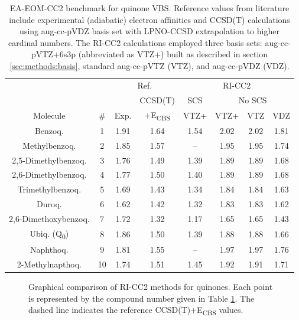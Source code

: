 \begin{table}[h!]
  \centering
  \caption[EA-EOM-CC2 benchmark for quinone VBS.]{EA-EOM-CC2 benchmark for quinone VBS. Reference values from literature\cite{schulz2018systematic} include experimental (adiabatic) electron affinities and CCSD(T) calculations using aug-cc-pVDZ basis set with LPNO-CCSD extrapolation to higher cardinal numbers. The RI-CC2 calculations employed three basis sets: aug-cc-pVTZ+6s3p (abbreviated as VTZ+) built as described in section \ref{sec:methods:basis}, standard aug-cc-pVTZ (VTZ), and aug-cc-pVDZ (VDZ).}
  \label{tab:Quinones}
  \begin{tabular*}{\textwidth}{cccccccc}
  \toprule
   & & \multicolumn{2}{c}{Ref. \cite{schulz2018systematic}} & \multicolumn{4}{c}{RI-CC2}  \\
   \cmidrule(lr){3-4} \cmidrule(lr){5-8}
   & & & CCSD(T) & SCS & \multicolumn{3}{c}{No SCS} \\
  \cmidrule(lr){6-8}
  Molecule & \# & Exp. & +E\textsubscript{CBS} & VTZ+ & VTZ+ & VTZ & VDZ  \\
  \midrule
  Benzoq. & 1  & 1.91 & 1.64 & 1.54 & 2.02 & 2.02 & 1.81 \\
  Methylbenzoq. & 2  & 1.85 & 1.57 &  --  & 1.95 & 1.95 & 1.74 \\
  2,5-Dimethylbenzoq. & 3  & 1.76 & 1.49 & 1.39 & 1.89 & 1.89 & 1.68 \\
  2,6-Dimethylbenzoq. & 4  & 1.77 & 1.50 & 1.40 & 1.89 & 1.89 & 1.68 \\
  Trimethylbenzoq. & 5  & 1.69 & 1.43 & 1.34 & 1.84 & 1.84 & 1.63 \\
  Duroq. & 6  & 1.62 & 1.42 & 1.32 & 1.83 & 1.83 & 1.62 \\
  2,6-Dimethoxybenzoq. & 7  & 1.72 & 1.32 & 1.17 & 1.65 & 1.65 & 1.43 \\
  Ubiq. (Q\textsubscript{0}) & 8  & 1.86 & 1.50 & 1.39 & 1.88 & 1.88 & 1.66 \\
  Naphthoq. & 9  & 1.81 & 1.55 &  --  & 1.97 & 1.97 & 1.76 \\
  2-Methylnapthoq. & 10 & 1.74 & 1.51 & 1.45 & 1.92 & 1.91 & 1.71 \\
  \bottomrule
  \end{tabular*}
\end{table}


\begin{figure}[h!]
  \centering
  \small
  
  \caption{Graphical comparison of RI-CC2 methods for quinones. Each point is represented by the compound number given in Table \ref{tab:Quinones}. The dashed line indicates the reference CCSD(T)+E\textsubscript{CBS} values.}
  \label{fig:Quinones}
\end{figure}
  
